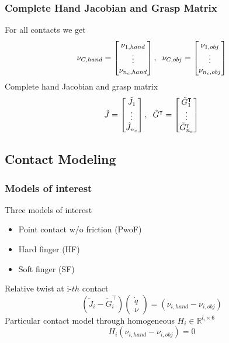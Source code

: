\documentclass{beamer}
\begin{document}

\begin{frame}
\frametitle{Complete Hand Jacobian and Grasp Matrix}
For all contacts we get
\begin{equation*}
\nu_{C,hand}=\begin{bmatrix}
\nu_{1,hand}\\
\vdots\\
\nu_{n_c,hand}
\end{bmatrix}, \hspace{.2cm} \nu_{C,obj}=\begin{bmatrix}
\nu_{1,obj}\\
\vdots\\
\nu_{n_c,obj}
\end{bmatrix}
\end{equation*}
Complete hand Jacobian and grasp matrix
\begin{equation*}
\tilde{J}=\begin{bmatrix}
\tilde{J}_{1}\\
\vdots\\
\tilde{J}_{n_c}
\end{bmatrix}, \hspace{.2cm} \tilde{G}^{\intercal}=\begin{bmatrix}
\tilde{G}^{\intercal}_{1}\\
\vdots\\
\tilde{G}^{\intercal}_{n_c}
\end{bmatrix}
\end{equation*}


\end{frame}

\subsection{Contact Modeling}
\begin{frame}
\frametitle{Models of interest}
Three models of interest
\begin{itemize}
\item Point contact w/o friction (PwoF)
\item Hard finger (HF)
\item Soft finger (SF)
\end{itemize}
\vspace{.2cm}
Relative twist at i-$th$ contact
\begin{equation*}
(\tilde{J}_{i}-\tilde{G}_{i}^{\intercal})\begin{pmatrix}
\dot{q}\\
\nu
\end{pmatrix}=(\nu_{i,hand} - \nu_{i,obj})
\end{equation*}
\vspace{.2cm}
Particular contact model through homogeneous $H_i\in \mathbb{R}^{l_i\times 6}$
\begin{equation*}
H_i(\nu_{i,hand} - \nu_{i,obj})=0
\end{equation*}

\end{frame}
\end{document}
